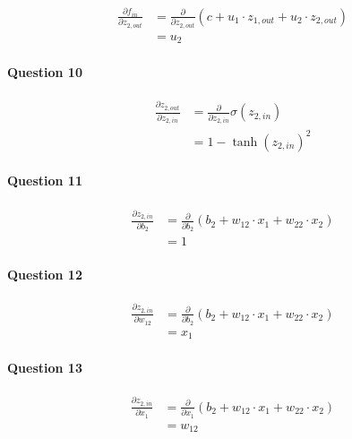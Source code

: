 \documentclass[
  a4paper,
]{article}
\begin{document}
\begin{align*}
\frac{\partial f_{in}}{\partial z_{2,out}}
&=\frac{\partial}{\partial z_{2,out}}\left(c+u_1\cdot z_{1,out}+u_2\cdot z_{2,out}\right) \\
&=u_2
\end{align*}

\hypertarget{question-10}{%
\paragraph{Question 10}\label{question-10}}

\begin{align*}
\frac{\partial z_{2,out}}{\partial z_{2,in}}
&=\frac{\partial}{\partial z_{2,in}}\sigma(z_{2,in})\\
&=1-\tanh(z_{2,in})^2
\end{align*}

\hypertarget{question-11}{%
\paragraph{Question 11}\label{question-11}}

\begin{align*}
\frac{\partial z_{2,in}}{\partial b_2}
&=\frac{\partial}{\partial b_2}\left(b_2+w_{12}\cdot x_1+w_{22}\cdot x_2 \right) \\
&=1
\end{align*}

\hypertarget{question-12}{%
\paragraph{Question 12}\label{question-12}}

\begin{align*}
\frac{\partial z_{2,in}}{\partial w_{12}}
&=\frac{\partial}{\partial b_2}\left(b_2+w_{12}\cdot x_1+w_{22}\cdot x_2 \right) \\
&=x_1
\end{align*}

\hypertarget{question-13}{%
\paragraph{Question 13}\label{question-13}}

\begin{align*}
\frac{\partial z_{2,in}}{\partial x_1}
&=\frac{\partial}{\partial x_1}\left(b_2+w_{12}\cdot x_1+w_{22}\cdot x_2 \right) \\
&=w_{12}
\end{align*}
\end{document}
